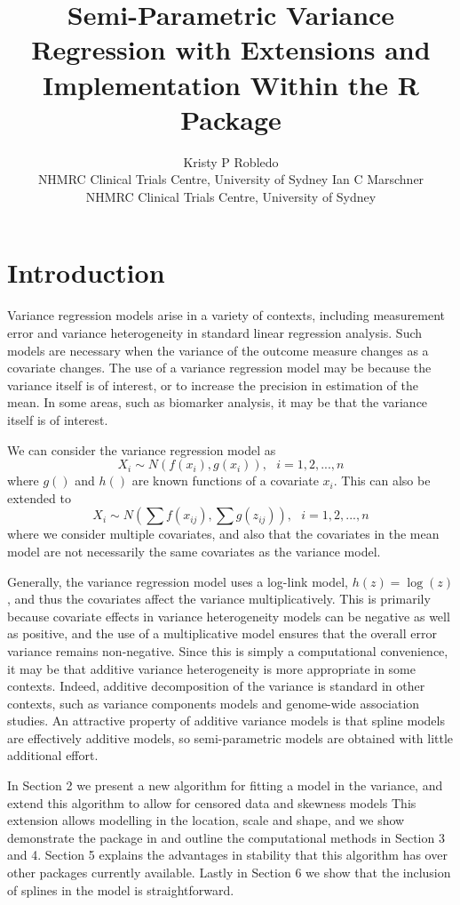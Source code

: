 \documentclass[
]{jss}
\author{
Kristy P Robledo\\NHMRC Clinical Trials Centre, University of Sydney \AND Ian C Marschner\\NHMRC Clinical Trials Centre, University of Sydney
}
\title{Semi-Parametric Variance Regression with Extensions and Implementation
Within the R Package \pkg{VarReg}}
\begin{document}
\hypertarget{introduction}{%
\section{Introduction}\label{introduction}}

Variance regression models arise in a variety of contexts, including
measurement error and variance heterogeneity in standard linear
regression analysis. Such models are necessary when the variance of the
outcome measure changes as a covariate changes. The use of a variance
regression model may be because the variance itself is of interest, or
to increase the precision in estimation of the mean. In some areas, such
as biomarker analysis, it may be that the variance itself is of
interest.

We can consider the variance regression model as \begin{equation} 
X_i \sim N\left( f(x_i), g(x_i) \right), ~~~ i=1,2,...,n
\end{equation} where \(g( )\) and \(h( )\) are known functions of a
covariate \(x_i\). This can also be extended to \begin{equation} 
X_i \sim N\left(\sum f(x_{ij}), \sum g(z_{ij}) \right), ~~~ i=1,2,...,n
\end{equation} where we consider multiple covariates, and also that the
covariates in the mean model are not necessarily the same covariates as
the variance model.

Generally, the variance regression model
\citep{Aitkin1987, Verbyla1993, Smyth2002} uses a log-link model,
\(h(z)=\log(z)\), and thus the covariates affect the variance
multiplicatively. This is primarily because covariate effects in
variance heterogeneity models can be negative as well as positive, and
the use of a multiplicative model ensures that the overall error
variance remains non-negative. Since this is simply a computational
convenience, it may be that additive variance heterogeneity is more
appropriate in some contexts. Indeed, additive decomposition of the
variance is standard in other contexts, such as variance components
models and genome-wide association studies. An attractive property of
additive variance models is that spline models are effectively additive
models, so semi-parametric models are obtained with little additional
effort.

In Section 2 we present a new algorithm for fitting a model in the
variance, and extend this algorithm to allow for censored data and
skewness models This extension allows modelling in the location, scale
and shape, and we show demonstrate the package  in
 and outline the computational methods in Section 3 and 4.
Section 5 explains the advantages in stability that this algorithm has
over other packages currently available. Lastly in Section 6 we show
that the inclusion of splines in the model is straightforward.
\end{document}
